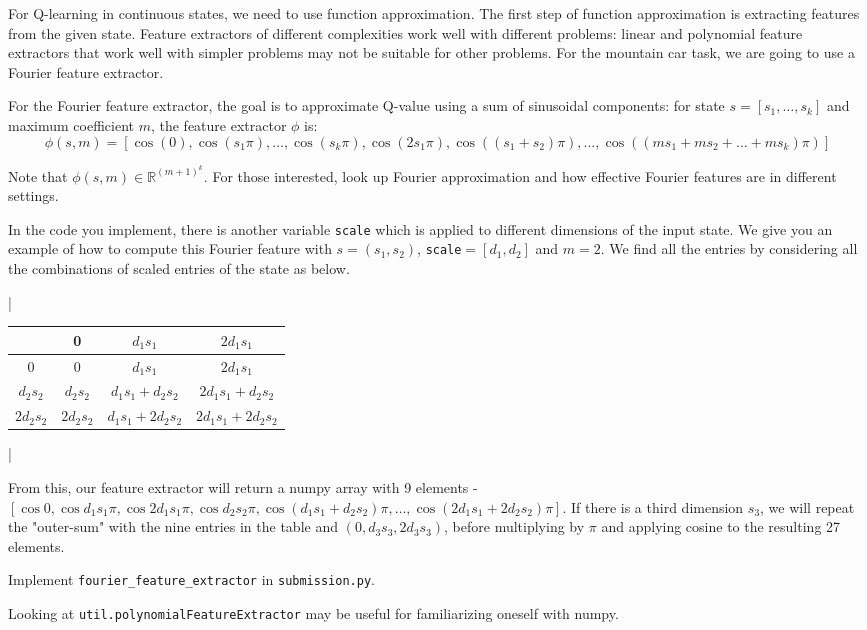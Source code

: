 \item {}

For Q-learning in continuous states, we need to use function approximation. The first step of function approximation is extracting 
features from the given state. Feature extractors of different complexities work well with different problems: linear and polynomial feature 
extractors that work well with simpler problems may not be suitable for other problems. For the mountain car task, we are going to use 
a Fourier feature extractor. 
    
For the Fourier feature extractor, the goal is to approximate Q-value using a sum of sinusoidal components: for state $s = [s_1, \ldots, s_k]$ and maximum coefficient $m$, the feature extractor $\phi$ is:
$$\phi(s, m) = [\cos(0), \cos(s_1\pi), \ldots, \cos(s_k\pi), \cos(2s_1\pi), \cos((s_1+s_2)\pi), \ldots, \cos((ms_1 + ms_2 + \ldots + ms_k)\pi)]$$

Note that $\phi(s, m) \in \mathbb{R}^{(m+1)^k}$. For those interested, look up Fourier approximation and how effective Fourier features are in different settings.

In the code you implement, there is another variable \texttt{scale} which is applied to different dimensions of the input state. We give you an example of how to compute this Fourier feature with $s = (s_1, s_2)$, \texttt{scale}$=[d_1, d_2]$ and $m=2$. We find all the entries by considering all the combinations of scaled entries of the state as below.
\begin{table}[h!]
    \centering
    \lstDeleteShortInline|                                                
    \begin{tabular}{|c|c|c|c|}
        \hline
        & 0 & $d_1 s_1$ & $2 d_1 s_1$ \\
        \hline
        0 & 0 & $d_1 s_1$ & $2 d_1 s_1$ \\
        \hline
        $d_2 s_2$ & $d_2 s_2$ & $d_1 s_1 + d_2 s_2$ & $2 d_1 s_1 + d_2 s_2$ \\
        \hline
        $2 d_2 s_2$ & $2 d_2 s_2$ & $d_1 s_1 + 2 d_2 s_2$ & $2 d_1 s_1 + 2 d_2 s_2$ \\
        \hline
    \end{tabular}
    \lstMakeShortInline|
\end{table}

From this, our feature extractor will return a numpy array with 9 elements - \\
$[\cos 0, \cos d_1s_1\pi, \cos 2d_1s_1\pi, \cos d_2s_2\pi, \cos (d_1s_1 + d_2s_2)\pi, \dots, \cos (2d_1s_1 + 2d_2s_2)\pi]$. If there is a third dimension $s_3$, we will repeat the "outer-sum" with the nine entries in the table and $(0, d_3s_3, 2d_3s_3)$, before multiplying by $\pi$ and applying cosine to the resulting 27 elements.

Implement \texttt{fourier\_feature\_extractor} in \texttt{submission.py}. 

Looking at \texttt{util.polynomialFeatureExtractor} may be useful
for familiarizing oneself with numpy.



